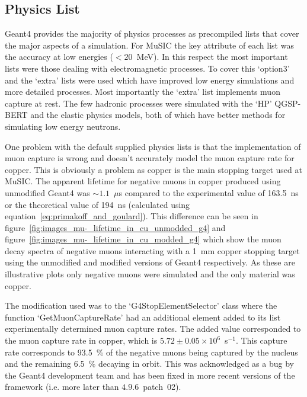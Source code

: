 \subsection{Physics List} %
\label{sec:physics_list}
Geant4 provides the majority of physics processes as precompiled lists that cover the major aspects of a simulation. For MuSIC the key attribute of each list was the accuracy at low energies (\(<20\)~MeV). In this respect the most important lists were those dealing with electromagnetic processes. To cover this `option3' and the `extra' lists were used which have improved low energy simulations and more detailed processes. Most importantly the `extra' list implements muon capture at rest. The few hadronic processes were simulated with the `HP' QGSP-BERT and the elastic physics models, both of which have better methods for simulating low energy neutrons.

One problem with the default supplied physics lists is that the implementation of muon capture is wrong and doesn't accurately model the muon capture rate for copper. This is obviously a problem as copper is the main stopping target used at MuSIC. The  apparent lifetime for negative muons in copper produced using unmodified Geant4 was \(\sim1.1\)~\(\mu\)s compared to the experimental value of 163.5~ns~\cite{suzuki_mu_capture_rates} or the theoretical value of 194~ns (calculated using equation~\ref{eq:primakoff_and_goulard}). This difference can be seen in figure~\ref{fig:images_mu-_lifetime_in_cu_unmodded_g4} and figure~\ref{fig:images_mu-_lifetime_in_cu_modded_g4} which show the muon decay spectra of negative muons interacting with a 1~mm copper stopping target using the unmodified and modified versions of Geant4 respectively. As these are illustrative plots only negative muons were simulated and the only material was copper.

The modification used was to the `G4StopElementSelector' class where the function `GetMuonCaptureRate' had an additional element added to its list experimentally determined muon capture rates. The added value corresponded to the muon capture rate in copper, which is \(5.72\pm0.05\times10^6\)~s\(^{-1}\). This capture rate corresponds to 93.5~\% of the negative muons being captured by the nucleus and the remaining 6.5~\% decaying in orbit. This was acknowledged as a bug by the Geant4 development team and has been fixed in more recent versions of the framework (i.e. more later than \(4.9.6\)~patch~02).

